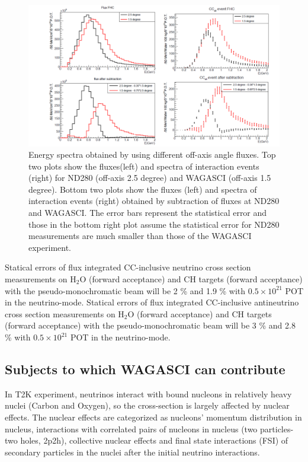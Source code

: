 \begin{figure}[tbh]
\begin{center}
\includegraphics[width=\textwidth]{fig/fluxsubtractFHC.pdf}
\end{center}
\caption{Energy spectra obtained by using different off-axis angle fluxes.
  Top two plots show the fluxes(left) and spectra of interaction events (right) for ND280 (off-axis 2.5 degree) and WAGASCI (off-axis 1.5 degree). Bottom two plots show the fluxes (left) and spectra of interaction events (right) obtained by
  subtraction of fluxes at ND280 and WAGASCI.
  The error bars represent the statistical error and those in the bottom
right plot assume the statistical error for ND280 measurements are much smaller
than those of the WAGASCI experiment.
}
\label{fig:fluxsubtfhc}
\end{figure}


Statical errors of flux integrated CC-inclusive neutrino cross section measurements on H$_{2}$O (forward acceptance) and CH targets (forward acceptance) with the pseudo-monochromatic beam
will be 2 \% and 1.9 \% with $0.5\times 10^{21}$ POT in the neutrino-mode.
Statical errors of flux integrated CC-inclusive antineutrino cross section measurements on H$_{2}$O (forward acceptance) and CH targets (forward acceptance) with the pseudo-monochromatic beam
will be 3 \% and 2.8 \% with $0.5\times 10^{21}$ POT in the neutrino-mode.


\subsection{Subjects to which WAGASCI can contribute}
In T2K experiment, neutrinos interact with bound nucleons in relatively heavy nuclei (Carbon and Oxygen), so the cross-section is largely affected by nuclear effects.
The nuclear effects are categorized as nucleons' momentum distribution in nucleus, interactions with  correlated pairs of nucleons in nucleus (two particles-two holes, 2p2h), collective nuclear effects 
and final state interactions (FSI) of secondary particles in the nuclei after the initial neutrino interactions.


